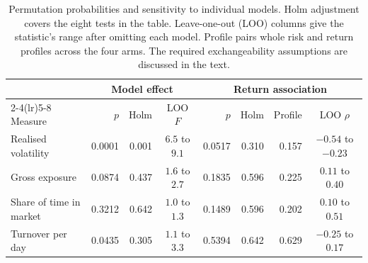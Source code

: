 \begin{table}[ht]
\centering
\footnotesize
\caption{Permutation probabilities and sensitivity to individual models.
Holm adjustment covers the eight tests in the table. Leave-one-out (LOO)
columns give the statistic's range after omitting each model. Profile
pairs whole risk and return profiles across the four arms. The required
exchangeability assumptions are discussed in the text.}
\label{tab:sens}
\begin{tabular}{lrrcrrrc}
\toprule
 & \multicolumn{3}{c}{Model effect} & \multicolumn{4}{c}{Return association} \\
\cmidrule(lr){2-4}\cmidrule(lr){5-8}
Measure & $p$ & Holm & LOO $F$ & $p$ & Holm & Profile & LOO $\rho$ \\
\midrule
Realised volatility & 0.0001 & 0.001 & $6.5$ to $9.1$ & 0.0517 & 0.310 & 0.157 & $-0.54$ to $-0.23$ \\
Gross exposure & 0.0874 & 0.437 & $1.6$ to $2.7$ & 0.1835 & 0.596 & 0.225 & $0.11$ to $0.40$ \\
Share of time in market & 0.3212 & 0.642 & $1.0$ to $1.3$ & 0.1489 & 0.596 & 0.202 & $0.10$ to $0.51$ \\
Turnover per day & 0.0435 & 0.305 & $1.1$ to $3.3$ & 0.5394 & 0.642 & 0.629 & $-0.25$ to $0.17$ \\
\bottomrule
\end{tabular}
\end{table}
